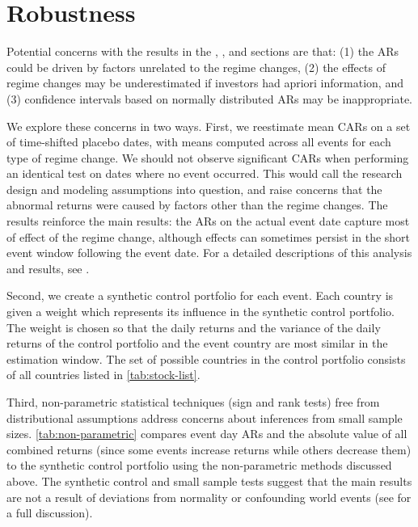 \documentclass[12pt,final,fleqn]{article}
\theoremstyle{plain}
\begin{document}
\vspace{-0.05cm}
\section{Robustness} \label{subsec: Robustness}

Potential concerns with the results in the , , and  sections are that: (1) the ARs could be driven by factors unrelated to the regime changes, (2) the effects of regime changes may be underestimated if investors had apriori information, and (3) confidence intervals based on normally distributed ARs may be inappropriate.

We explore these concerns in two ways. First, we reestimate mean CARs on a set of time-shifted placebo dates, with means computed across all events for each type of regime change. We should not observe significant CARs when performing an identical test on dates where no event occurred. This would call the research design and modeling assumptions into question, and raise concerns that the abnormal returns were caused by factors other than the regime changes. The results reinforce the main results: the ARs on the actual event date capture most of effect of the regime change, although effects can sometimes persist in the short event window following the event date. For a detailed descriptions of this analysis and results, see .

Second, we create a synthetic control portfolio for each event. Each country is given a weight which represents its influence in the synthetic control portfolio. The weight is chosen so that the daily returns and the variance of the daily returns of the control portfolio and the event country are most similar in the estimation window. The set of possible countries in the control portfolio consists of all countries listed in \autoref{tab:stock-list}.

Third, non-parametric statistical techniques (sign and rank tests) free from distributional assumptions address concerns about inferences from small sample sizes. \autoref{tab:non-parametric} compares event day ARs and the absolute value of all combined returns (since some events increase returns while others decrease them) to the synthetic control portfolio using the non-parametric methods discussed above. The synthetic control and small sample tests suggest that the main results are not a result of deviations from normality or confounding world events (see  for a full discussion). 
\end{document}
